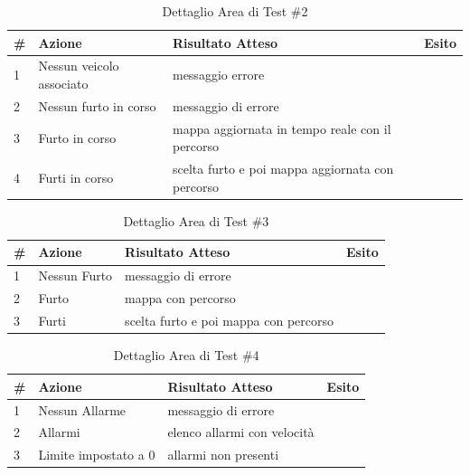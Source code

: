 \documentclass[a4paper,12pt]{article}
\begin{document}
\begin{table}[h]
\begin{center}
\caption{Dettaglio Area di Test \#2}
\begin{tabular}{p{0.5cm} p{4.5cm} p{7cm} p{1cm}}
\rowcolor{Ash}
\hline
\# & Azione & Risultato Atteso & Esito \\ \hline
1 & Nessun veicolo associato	& messaggio errore		&	\cellcolor{green}{OK}\\
2 & Nessun furto in corso		&	messaggio di errore & 	\cellcolor{green}{OK}\\
3 & Furto in corso			&	mappa aggiornata in tempo reale con il percorso	&	\cellcolor{green}{OK}\\
4 & Furti in corso			&	scelta furto e poi mappa aggiornata con percorso	&	\cellcolor{green}{OK}\\ \hline
\end{tabular}
\end{center}
\end{table}

\pagebreak


\begin{table}[ht]
\begin{center}
\caption{Dettaglio Area di Test \#3}
\begin{tabular}{p{0.5cm} p{4cm} p{7.5cm} p{1cm}}
\rowcolor{Ash}
\hline
\# & Azione & Risultato Atteso & Esito \\ \hline
1 & Nessun Furto	&	messaggio di errore		&		\cellcolor{green}{OK}\\
2 & Furto			&	mappa con percorso			&					\cellcolor{green}{OK}\\
3 & Furti			&	scelta furto e poi mappa con percorso	&		\cellcolor{green}{OK}\\ \hline
\end{tabular}
\end{center}
\end{table}


\begin{table}[ht]
\begin{center}
\caption{Dettaglio Area di Test \#4}
\begin{tabular}{p{0.5cm} p{4cm} p{7.5cm} p{1cm}}
\rowcolor{Ash}
\hline
\# & Azione & Risultato Atteso & Esito \\ \hline
1 & Nessun Allarme		&	messaggio di errore			&		\cellcolor{green}{OK}\\
2 & Allarmi				&	elenco allarmi con velocità 	&		\cellcolor{green}{OK}\\
3 & Limite impostato a 0	&	allarmi non presenti		&		\cellcolor{green}{OK}\\ \hline
\end{tabular}
\end{center}
\end{table}
\end{document}
